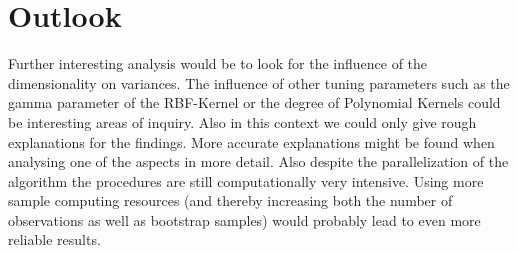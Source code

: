 \documentclass[a4paper]{article}
\begin{document}
\section{Outlook}

Further interesting analysis would be to look for the influence of the dimensionality on variances. The influence of other tuning parameters such as the gamma parameter of the RBF-Kernel or the degree of Polynomial Kernels could be interesting areas of inquiry. Also in this context we could only give rough explanations for the findings. More accurate explanations might be found when analysing one of the aspects in more detail. Also despite the parallelization of the algorithm the procedures are still computationally very intensive. Using more sample computing resources (and thereby increasing both the number of observations as well as bootstrap samples) would probably lead to even more reliable results.


\footnotesize


\end{document}

